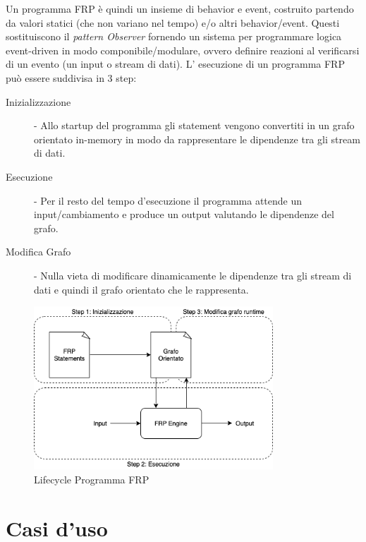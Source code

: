 \documentclass[../main.tex]{subfiles}
\begin{document}
Un programma FRP è quindi un insieme di behavior e event, costruito partendo da valori statici (che non variano nel tempo) e/o altri behavior/event. Questi sostituiscono il \textit{pattern Observer} fornendo un sistema per programmare logica event-driven in modo componibile/modulare, ovvero definire reazioni al verificarsi di un evento (un input o stream di dati). L' esecuzione di un programma FRP può essere suddivisa in 3 step:
\begin{description}
    \item[Inizializzazione] - Allo startup del programma gli statement vengono convertiti in un grafo orientato in-memory in modo da rappresentare le dipendenze tra gli stream di dati.
    \item[Esecuzione] - Per il resto del tempo d'esecuzione il programma attende un input/cambiamento e produce un output valutando le dipendenze del grafo.
    \item[Modifica Grafo] - Nulla vieta di modificare dinamicamente le dipendenze tra gli stream di dati e quindi il grafo orientato che le rappresenta.
\end{description}

\begin{figure}[H]
\centering
\includegraphics[width=0.8\textwidth]{img/frp-scala1.png}
\caption{Lifecycle Programma FRP}
\end{figure}

\section{Casi d'uso}
\end{document}
